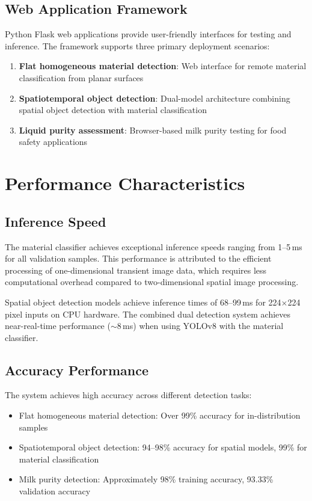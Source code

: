 \documentclass[10pt,twocolumn]{article}
\begin{document}
\subsection{Web Application Framework}

Python Flask web applications provide user-friendly interfaces for testing and inference. The framework supports three primary deployment scenarios:

\begin{enumerate}
    \item \textbf{Flat homogeneous material detection}: Web interface for remote material classification from planar surfaces
    \item \textbf{Spatiotemporal object detection}: Dual-model architecture combining spatial object detection with material classification
    \item \textbf{Liquid purity assessment}: Browser-based milk purity testing for food safety applications
\end{enumerate}

\section{Performance Characteristics}

\subsection{Inference Speed}

The material classifier achieves exceptional inference speeds ranging from 1--5\,ms for all validation samples. This performance is attributed to the efficient processing of one-dimensional transient image data, which requires less computational overhead compared to two-dimensional spatial image processing.

Spatial object detection models achieve inference times of 68--99\,ms for 224$\times$224 pixel inputs on CPU hardware. The combined dual detection system achieves near-real-time performance ($\sim$8\,ms) when using YOLOv8 with the material classifier.

\subsection{Accuracy Performance}

The system achieves high accuracy across different detection tasks:

\begin{itemize}
    \item Flat homogeneous material detection: Over 99\% accuracy for in-distribution samples
    \item Spatiotemporal object detection: 94--98\% accuracy for spatial models, 99\% for material classification
    \item Milk purity detection: Approximately 98\% training accuracy, 93.33\% validation accuracy
\end{itemize}
\end{document}
